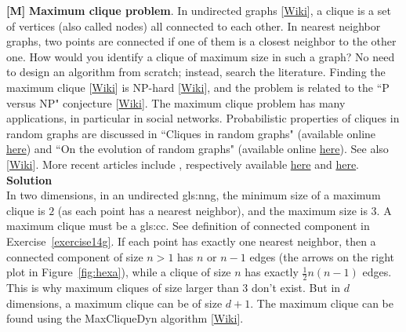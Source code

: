 \documentclass[10pt]{article}
\begin{document}
\begin{Exercise}\label{cliquebc}{\bf [M]} {\bf Maximum clique problem}. In \textcolor{index}{undirected graphs} [\href{https://en.wikipedia.org/?title=Undirected_graph}{Wiki}], a 
\textcolor{index}{clique} is a set of vertices (also called nodes) all connected to each other.  In 
\textcolor{index}{nearest neighbor} graphs, two points are connected if one of them is a closest neighbor to the other one.  How would you identify a clique of maximum size in such a graph? No need to design an algorithm from scratch; instead, search the literature. Finding the maximum clique 
[\href{https://en.wikipedia.org/wiki/Clique_problem}{Wiki}] is NP-hard [\href{https://en.wikipedia.org/wiki/NP-hardness}{Wiki}], and the problem is related to the 
``P versus NP" conjecture [\href{https://en.wikipedia.org/wiki/P_versus_NP_problem}{Wiki}].  The maximum clique problem has many applications,
in particular in social networks.  Probabilistic properties of cliques in \textcolor{index}{random graphs} are discussed in
``Cliques in random graphs" \cite{erdos311} (available online \href{https://users.renyi.hu/~p_erdos/1976-05.pdf}{here}) and 
``On the evolution of random graphs" \cite{erdos310} (available online \href{http://snap.stanford.edu/class/cs224w-readings/erdos60random.pdf}{here}).
See also [\href{https://bit.ly/3uzQzNF}{Wiki}]. More recent articles include \cite{mec45,nmbv}, respectively available
 \href{https://arxiv.org/abs/1308.3297}{here} and \href{https://arxiv.org/abs/1508.01668}{here}. \vspace{1ex} \\
{\bf Solution}\nopagebreak \vspace{1ex}\\
In two dimensions, in an \textcolor{index}{undirected} \gls{gls:nng}, 
the minimum size of a maximum clique is $2$ (as each point has a nearest neighbor), and the maximum size is $3$. A maximum clique must be a 
\gls{gls:cc}. See definition of connected component in Exercise~\ref{exercise14g}. If each point has exactly one nearest neighbor, then a connected component of size $n>1$ has $n$ or $n-1$ edges
(the arrows on the right plot in Figure~\ref{fig:hexa}), while a clique of size $n$ has exactly $\frac{1}{2}n(n-1)$ edges. This is why maximum cliques of size larger than $3$ don't exist. But in $d$ dimensions, a maximum clique can be of size $d+1$. The maximum clique can be found using the MaxCliqueDyn 
algorithm [\href{https://en.wikipedia.org/wiki/MaxCliqueDyn_maximum_clique_algorithm}{Wiki}]. 
\end{Exercise}
\end{document}
